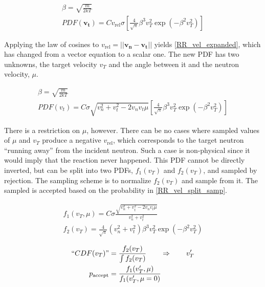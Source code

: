 \begin{equation}
\label{RR_vel_simp}
\begin{gathered}
\beta = \sqrt{\frac{m}{2kT}} \\
PDF(\boldsymbol{v_t}) = C v_\mathrm{rel} \sigma \left[   \frac{4}{\sqrt{\pi}} \beta^3 v_T^2  \exp (- \beta^2  v_T^2 )      \right]
\end{gathered}
\end{equation}

Applying the law of cosines to $v_\mathrm{rel} = ||\boldsymbol{v_n}-\boldsymbol{v_t}||$ yields \eqref{RR_vel_expanded}, which has changed from a vector equation to a scalar one.   The new PDF has two unknowns, the target velocity $v_T$ and the angle between it and the neutron velocity, $\mu$.

\begin{equation}
\label{RR_vel_expanded}
\begin{gathered}
\beta = \sqrt{\frac{m}{2kT}} \\
PDF(v_t) = C \sigma  \sqrt{v_n^2+v_t^2-2 v_n v_t \mu} \left[   \frac{4}{\sqrt{\pi}} \beta^3 v_T^2  \exp ( -\beta^2  v_T^2 )      \right]
\end{gathered}
\end{equation}

There is a restriction on $\mu$, however.  There can be no cases where sampled values of $\mu$ and $v_T$ produce a negative $v_\mathrm{rel}$, which corresponds to the target neutron ``running away'' from the incident neutron.  Such a case is non-physical since it would imply that the reaction never happened.  This PDF cannot be directly inverted, but can be split into two PDFs, $f_1(v_T)$ and $f_2(v_T)$, and sampled by rejection.  The sampling scheme is to normalize $f_2(v_T)$ and sample from it.  The sampled is accepted based on the probability in \eqref{RR_vel_split_samp}\cite{openmc}.

\begin{equation}
\label{RR_vel_split}
\begin{gathered}
f_1(v_T,\mu) = C \sigma  \frac{\sqrt{v_n^2+v_t^2-2 v_n v_t \mu}}{v_n^2+v_t^2}\\
f_2(v_T) =  \frac{4}{\sqrt{\pi}} (v_n^2+v_t^2) \beta^3 v_T^2  \exp ( -\beta^2  v_T^2 )
\end{gathered}
\end{equation}

\begin{equation}
\label{RR_vel_split_samp}
\begin{split}
``CDF(v_T)" &= \frac{f_2(v_T)}{\int f_2(v_T)} \qquad \Rightarrow \qquad v_T^\prime  \\
p_\mathrm{accept} &= \frac{f_1(v_T^\prime,\mu)}{ f_1(v_T^\prime,\mu=0)}
\end{split}
\end{equation}


